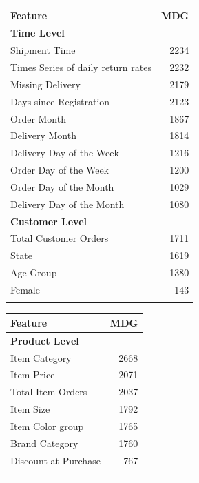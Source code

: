 \documentclass[12pt]{article}
\begin{document}
\begin{table}[H]
    \begin{minipage}{.451\linewidth}
      \centering
        \begin{tabular}{lr}
      \hline\hline
      \noalign{\smallskip}
          \textbf{Feature}& \textbf{MDG}\\ 
\hline
\noalign{\smallskip}
\textbf{Time Level}\\ 
Shipment Time & 2234\\
Times Series of daily return rates & 2232 \\
Missing Delivery & 2179\\
Days since Registration & 2123\\
Order Month & 1867\\
Delivery Month & 1814\\
Delivery Day of the Week & 1216\\
Order Day of the Week & 1200\\
Order Day of the Month & 1029\\
Delivery Day of the Month & 1080\\
\noalign{\smallskip}
\noalign{\smallskip}
\textbf{Customer Level} \\ 
Total Customer Orders & 1711\\
State & 1619\\
Age Group & 1380\\
Female  & 143\\
\noalign{\smallskip}
\hline\hline       

        \end{tabular}
    \end{minipage}%
    \begin{minipage}{.5\linewidth}
      \centering
        \begin{tabular}{|lr}
      \hline\hline
      \noalign{\smallskip}
          \textbf{Feature} & \textbf{MDG}\\ 
\hline
\noalign{\smallskip}
\textbf{Product Level} \\ 

Item Category & 2668\\
Item Price & 2071 \\
Total Item Orders & 2037\\
Item Size & 1792\\
Item Color group & 1765\\
Brand Category & 1760\\
Discount at Purchase & 767\\
& \\
& \\


\end{tabular}
\end{minipage}
\end{table}
\end{document}
